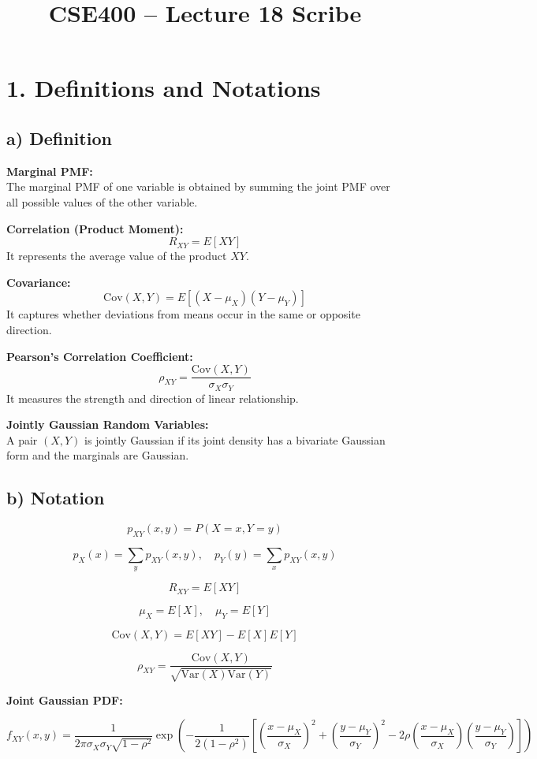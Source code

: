 \documentclass[12pt]{article}
\begin{document}
\title{CSE400 -- Lecture 18 Scribe}
\date{}
\maketitle

\section*{1. Definitions and Notations}

\subsection*{a) Definition}

\textbf{Marginal PMF:} \\
The marginal PMF of one variable is obtained by summing the joint PMF over all possible values of the other variable.

\textbf{Correlation (Product Moment):}
\[
R_{XY} = E[XY]
\]
It represents the average value of the product $XY$.

\textbf{Covariance:}
\[
\mathrm{Cov}(X,Y) = E[(X-\mu_X)(Y-\mu_Y)]
\]
It captures whether deviations from means occur in the same or opposite direction.

\textbf{Pearson’s Correlation Coefficient:}
\[
\rho_{XY} = \frac{\mathrm{Cov}(X,Y)}{\sigma_X \sigma_Y}
\]
It measures the strength and direction of linear relationship.

\textbf{Jointly Gaussian Random Variables:} \\
A pair $(X,Y)$ is jointly Gaussian if its joint density has a bivariate Gaussian form and the marginals are Gaussian.

\subsection*{b) Notation}

\[
p_{XY}(x,y) = P(X=x,Y=y)
\]

\[
p_X(x) = \sum_y p_{XY}(x,y), \quad p_Y(y) = \sum_x p_{XY}(x,y)
\]

\[
R_{XY} = E[XY]
\]

\[
\mu_X = E[X], \quad \mu_Y = E[Y]
\]

\[
\mathrm{Cov}(X,Y) = E[XY] - E[X]E[Y]
\]

\[
\rho_{XY} = \frac{\mathrm{Cov}(X,Y)}{\sqrt{\mathrm{Var}(X)\mathrm{Var}(Y)}}
\]

\textbf{Joint Gaussian PDF:}

\[
f_{XY}(x,y) =
\frac{1}{2\pi \sigma_X \sigma_Y \sqrt{1-\rho^2}}
\exp\left(
-\frac{1}{2(1-\rho^2)}
\left[
\left(\frac{x-\mu_X}{\sigma_X}\right)^2 +
\left(\frac{y-\mu_Y}{\sigma_Y}\right)^2 -
2\rho \left(\frac{x-\mu_X}{\sigma_X}\right)\left(\frac{y-\mu_Y}{\sigma_Y}\right)
\right]
\right)
\]
\end{document}
